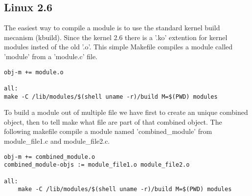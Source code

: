 \documentclass[11pt]{report}
\begin{document}
  \subsection{Linux 2.6}
The easiest way to compile a module is to use the standard kernel build
mecanism (kbuild). Since the kernel 2.6 there is a '.ko' extention for kernel 
modules insted of the old '.o'.
This simple Makefile compiles a module called 'module'
from a 'module.c' file.
    \begin{lstlisting}
obj-m += module.o

all:
make -C /lib/modules/$(shell uname -r)/build M=$(PWD) modules
    \end{lstlisting}
To build a module out of multiple file we have first to
create an unique combined object, then to tell make what file are part
of that combined object. The following makefile compile a module 
named 'combined\_module' from module\_file1.c and module\_file2.c.
    \begin{lstlisting}
obj-m += combined_module.o
combined_module-objs := module_file1.o module_file2.o

all:
    make -C /lib/modules/$(shell uname -r)/build M=$(PWD) modules
    \end{lstlisting}
\end{document}
